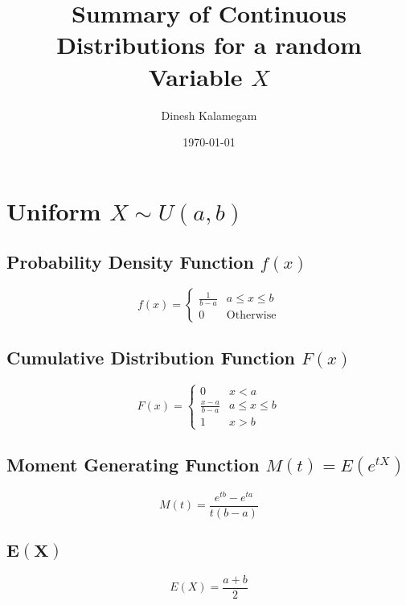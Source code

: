 \documentclass[12pt]{article}
\begin{document}
\title{Summary of Continuous Distributions for a random Variable $X$}
\author{Dinesh Kalamegam}
\date{\today}
\maketitle

\section{Uniform $X \sim U(a,b)$}
\subsection{Probability Density Function $f(x)$}

\begin{equation*}
  f(x) =
  \begin{cases}
     \frac{1}{b-a} & a \leq x \leq b \\
     0 & \text{Otherwise}
  \end{cases}
\end{equation*}

\subsection{Cumulative Distribution Function $F(x)$}

\begin{equation*}
  F(x) =
  \begin{cases}
     0 & x <a \\
     \frac{x-a}{b-a} & a \leq x \leq b \\
     1 & x>b
  \end{cases}
\end{equation*}

\subsection{Moment Generating Function $M(t)=E(e^{tX})$}

\begin{equation*}
    M(t)=\frac{e^{tb}-e^{ta}}{t(b-a)}
\end{equation*}

\subsection{$\bm{E(X)}$}

\begin{equation*}
  E(X) = \frac{a+b}{2}
\end{equation*}
\end{document}
